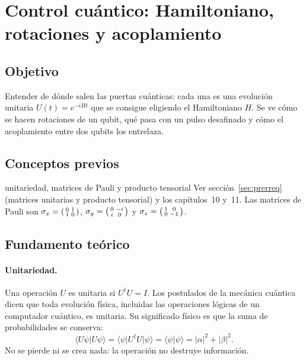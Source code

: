 \def\tituloconcepto{Control cuántico}


\section{Control cuántico: Hamiltoniano, rotaciones y acoplamiento}

\subsection{Objetivo}
Entender de dónde salen las puertas cuánticas: cada una es una evolución
unitaria $U(t)=e^{-iHt}$ que se consigue eligiendo el Hamiltoniano $H$.
Se ve cómo se hacen rotaciones de un qubit, qué pasa con un pulso desafinado y
cómo el acoplamiento entre dos qubits los entrelaza.

\subsection{Conceptos previos}
\begin{concepto}{unitariedad, matrices de Pauli y producto tensorial}
Ver sección~\ref{sec:prerreq} (matrices unitarias y producto tensorial) y los
capítulos~10 y~11. Las matrices de Pauli son
$\sigma_x=\begin{psmallmatrix}0&1\\1&0\end{psmallmatrix}$,
$\sigma_y=\begin{psmallmatrix}0&-i\\i&0\end{psmallmatrix}$ y
$\sigma_z=\begin{psmallmatrix}1&0\\0&-1\end{psmallmatrix}$.
\end{concepto}

\subsection{Fundamento teórico}
\paragraph{Unitariedad.} Una operación $U$ es unitaria si $U^\dagger U=I$. Los
postulados de la mecánica cuántica dicen que toda evolución física, incluidas
las operaciones lógicas de un computador cuántico, es unitaria. Su significado
físico es que la suma de probabilidades se conserva:
\begin{equation}
  \langle U\psi|U\psi\rangle=\langle\psi|U^\dagger U|\psi\rangle
  =\langle\psi|\psi\rangle=|\alpha|^2+|\beta|^2 .
\end{equation}
No se pierde ni se crea nada: la operación no destruye información.

